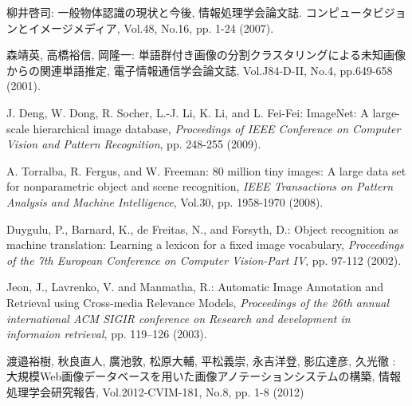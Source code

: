 \begin{thebibliography}{9}

柳井啓司: 一般物体認識の現状と今後,
情報処理学会論文誌. コンピュータビジョンとイメージメディア, Vol.48, No.16, pp. 1-24 (2007).

森靖英, 高橋裕信, 岡隆一: 単語群付き画像の分割クラスタリングによる未知画像からの関連単語推定, 
電子情報通信学会論文誌, Vol.J84-D-II, No.4, pp.649-658 (2001).

J. Deng, W. Dong, R. Socher, L.-J. Li, K. Li, and L. Fei-Fei: 
ImageNet: A large-scale hierarchical image database, 
{\it Proceedings of IEEE Conference on Computer Vision and Pattern Recognition}, pp. 248-255 (2009).

A. Torralba, R. Fergus, and W. Freeman:
80 million tiny images: A large data set for nonparametric object and scene recognition, 
{\it IEEE Transactions on Pattern Analysis and Machine Intelligence}, Vol.30, pp. 1958-1970 (2008).


Duygulu, P., Barnard, K., de Freitas, N., and Forsyth, D.: 
Object recognition as machine translation: Learning a lexicon for a fixed image vocabulary, 
{\it Proceedings of the 7th European Conference on Computer Vision-Part IV}, pp. 97-112 (2002).

Jeon, J., Lavrenko, V. and Manmatha, R.: 
Automatic Image Annotation and Retrieval using Cross-media Relevance Models, 
{\it Proceedings of the 26th annual international ACM SIGIR conference on Research and development in informaion retrieval}, 
pp. 119--126 (2003).

渡邉裕樹, 秋良直人, 廣池敦, 松原大輔, 平松義崇, 永吉洋登, 影広達彦, 久光徹 : 
大規模Web画像データベースを用いた画像アノテーションシステムの構築, 情報処理学会研究報告, Vol.2012-CVIM-181, No.8, pp. 1-8 (2012)

\end{thebibliography}